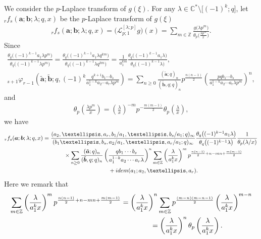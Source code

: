 \documentclass[11pt]{article}
\numberwithin{equation}{section}
\newcommand{\idem}{{\rm idem}}
\begin{document}
We consider the $p$-Laplace transform of $g(\xi)$. For any $\lambda\in\mathbb{C}^*\setminus\big[(-1)^k;q\big]$, let ${}_rf_s(\bm{a};\bm{b};\lambda;q,x)$ be the $p$-Laplace transform of $g(\xi)$
\begin{gather*}
{}_rf_s(\bm{a};\bm{b};\lambda;q,x)=\big(\mathcal{L}_{p;1}^{[\lambda;p]}g\big)(x)=\sum_{m\in\mathbb{Z}}\frac{g\big(\lambda p^m\big)}{\theta_p\big(\frac{\lambda p^m}{x}\big)}.
\end{gather*}
Since
\begin{gather*}
\frac{\theta_q\big((-1)^{k-1}a_1\lambda p^m\big)}{\theta_q\big((-1)^{k-1}\lambda p^m\big)}=\frac{\theta_q\big((-1)^{k-1}a_1\lambda q^{km}\big)}{\theta_q\big((-1)^{k-1}\lambda q^{km}\big)}=\frac{1}{a_1^{km}}\frac{\theta_q\big((-1)^{k-1}a_1\lambda\big)}{\theta_q\big((-1)^{k-1}\lambda\big)},
\\
{}_{s+1}\varphi_{r-1}\left(\tilde{\bm{a}};\tilde{\bm{b}};q,(-1)^k\frac{q^{k+1}b_1\cdots b_s}{a_1^{1-k}a_2\cdots a_r\lambda p^m}\right)=\sum_{n\ge0}\frac{(\tilde{\bm{a}};q)_n}{(\tilde{\bm{b}},q;q)_n}p^{\frac{n(n-1)}{2}}\left(\frac{pqb_1\cdots b_s}{a_1^{1-k}a_2\cdots a_r\lambda p^m}\right)^n,
\end{gather*}
and
\begin{gather*}
\theta_p\left(\frac{\lambda p^m}{x}\right)=\left(\frac{\lambda}{x}\right)^{-m}p^{-\frac{m(m-1)}{2}}\theta_p\left(\frac{\lambda}{x}\right),
\end{gather*}
we have
\begin{gather*}
{}_rf_s(\bm{a};\bm{b};\lambda;q,x)= \frac{(a_2,\ldots,a_r,b_1/a_1,\ldots,b_{s}/a_1;q)_\infty}{(b_1\ldots,b_s,a_2/a_1,\ldots, a_r/a_1;q)_\infty}\frac{\theta_q\big((-1)^{k-1}a_1\lambda\big)}{\theta_q\big((-1)^{k-1}\lambda\big)}\frac{1}{\theta_p(\lambda/x)}\\
\hphantom{{}_rf_s(\bm{a};\bm{b};\lambda;q,x)=}{} \times\sum_{n\ge0}\frac{(\tilde{\bm{a}};q)_n}{(\tilde{\bm{b}},q;q)_n}\left(\frac{qb_1\cdots b_s}{a_1^{1-k}a_2\cdots a_r\lambda}\right)^n \sum_{m\in\mathbb{Z}}\left(\frac{\lambda}{a_1^kx}\right)^mp^{\frac{n(n-1)}{2}+n-mn+\frac{m(m-1)}{2}}\\
\hphantom{{}_rf_s(\bm{a};\bm{b};\lambda;q,x)=}{} +\idem(a_1;a_2,\ldots,a_r).
\end{gather*}
Here we remark that
\begin{gather*}
\sum_{m\in\mathbb{Z}}\left(\frac{\lambda}{a_1^kx}\right)^mp^{\frac{n(n-1)}{2}+n-mn+\frac{m(m-1)}{2}} =\left(\frac{\lambda}{a_1^kx}\right)^n\sum_{m\in\mathbb{Z}}p^{\frac{(m-n)(m-n-1)}{2}}\left(\frac{\lambda}{a_1^kx}\right)^{m-n}\\
\hphantom{\sum_{m\in\mathbb{Z}}\left(\frac{\lambda}{a_1^kx}\right)^mp^{\frac{n(n-1)}{2}+n-mn+\frac{m(m-1)}{2}} }{}
=\left(\frac{\lambda}{a_1^kx}\right)^n\theta_p\left(\frac{\lambda}{a_1^kx}\right).
\end{gather*}
\end{document}
